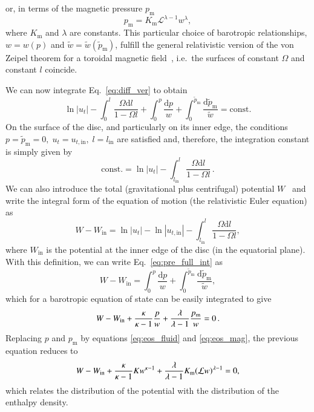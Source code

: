 \documentclass[referee]{aa}
\begin{document}
or, in terms of the magnetic pressure $p_{\mathrm{m}}$
\begin{equation}\label{eq:eos_mag}
p_{\mathrm{m}} = K_{\mathrm{m}} \mathcal{L}^{\lambda
-1} w^{\lambda
},
\end{equation}
where $K_{\mathrm{m}}$ and $\lambda
$ are constants.
This particular choice of barotropic relationships, $w = w(p)$ and $\tilde{w} = \tilde{w}(\tilde{p}_{\mathrm{m}})$, fulfill the general relativistic version of the von Zeipel theorem for a toroidal magnetic field~\citep{vonZeipel:1924, Zanotti:2015}, i.e.~the surfaces of constant $\Omega$ and constant $l$ coincide.

We can now integrate Eq.~\eqref{eq:diff_ver} to obtain
\begin{equation}\label{eq:pre_full_int}
\ln |u_t| - \int^l_0 \frac{\Omega \mathrm{d}l}{1 - \Omega l} + \int^p_0 \frac{\mathrm{d}p}{w} + \int_0^{\tilde{p}_{\mathrm{m}}} \frac{\mathrm{d}\tilde{p}_{\mathrm{m}}}{\tilde{w}} = \mathrm{const}.
\end{equation}
On the surface of the disc, and particularly on its inner edge, the conditions
$p = \tilde{p}_{\mathrm{m}} = 0, \; u_t = u_{t, \mathrm{in}}, \; l = l_{\mathrm{in}}$
are satisfied and, therefore, the integration constant is simply given by
\begin{equation}
\mathrm{const.} = \ln |u_t| - \int^l_{l_\mathrm{in}} \frac{\Omega \mathrm{d}l}{1 - \Omega l}\,.
\end{equation}
We can also introduce the total (gravitational plus centrifugal) potential $W$~\citep{Abramowicz:1978} and write the integral form of the equation of motion (the relativistic Euler equation) as
\begin{equation}\label{eq:potential}
W - W_{\mathrm{in}} = \ln|u_t| - \ln|u_{t,\mathrm{in}}| - \int^{l}_{l_{\mathrm{in}}} \frac{\Omega \mathrm{d}l}{1 - \Omega l},
\end{equation}
where $W_{\mathrm{in}}$ is the potential at the inner edge of the disc (in the equatorial plane). With this definition, we can write Eq.~\eqref{eq:pre_full_int} as
\begin{equation}\label{eq:full_int}
W - W_{\mathrm{in}} = \int^p_0 \frac{\mathrm{d}p}{w} + \int_0^{\tilde{p}_{\mathrm{m}}} \frac{\mathrm{d}\tilde{p}_{\mathrm{m}}}{\tilde{w}},
\end{equation}
which for a barotropic equation of state can be easily integrated to give
\begin{equation}\label{eq:pre_enthalpy_eq}
W - W_{\rm{in}} + \frac{\kappa}{\kappa - 1}\frac{p}{w} + \frac{\lambda
}{\lambda
 - 1}\frac{p_{\mathrm{m}}}{w} = 0\,.
\end{equation}
Replacing $p$ and $p_{\mathrm{m}}$ by equations \eqref{eq:eos_fluid} and \eqref{eq:eos_mag}, the previous equation reduces to
\begin{equation}\label{eq:enthalpy_eq}
W - W_{\rm{in}} + \frac{\kappa}{\kappa - 1} K w^{\kappa - 1} + \frac{\lambda
}{\lambda
 - 1}K_{\mathrm{m}}(\mathcal{L} w)^{\lambda
 - 1} = 0,
\end{equation}
which relates the distribution of the potential with the distribution of the enthalpy density.
\end{document}
